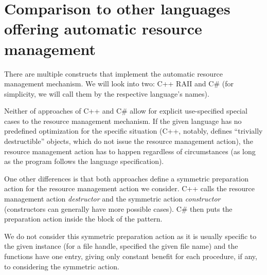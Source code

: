\section{Comparison to other languages offering automatic resource management}

There are multiple constructs that implement the automatic resource management mechanism. We will look into two: C++ RAII and C\#  (for simplicity, we will call them by the respective language's names).

Neither of approaches of C++ and C\# allow for explicit use-specified special cases to the resource management mechanism. If the given language has no predefined optimization for the specific situation (C++, notably, defines ``trivially destructible'' objects, which do not issue the resource management action), the resource management action has to happen regardless of circumstances (as long as the program follows the language specification).

One other differences is that both approaches define a symmetric preparation action for the resource management action we consider. C++ calls the resource management action \emph{destructor} and the symmetric action \emph{constructor} (constructors can generally have more possible cases). C\# then puts the preparation action inside the  block of the pattern.

We do not consider this symmetric preparation action as it is usually specific to the given instance (for a file handle, specified the given file name) and the functions have one entry, giving only constant benefit for each procedure, if any, to considering the symmetric action.
